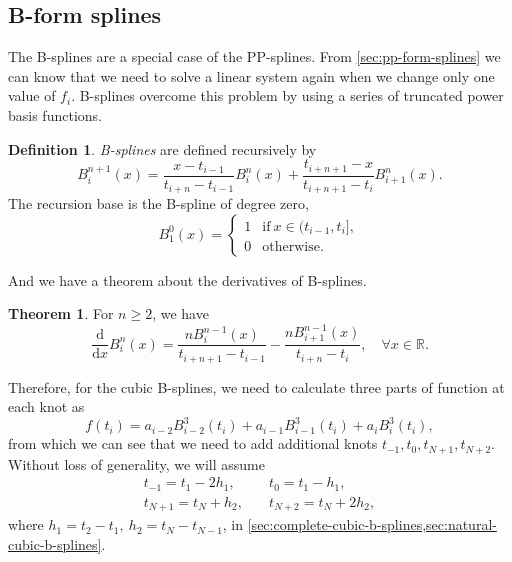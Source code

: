 \documentclass[a4paper]{article}
\theoremstyle{definition}
\newtheorem{definition}{Definition}
\newtheorem{theorem}{Theorem}
\begin{document}
\subsection{B-form splines}

The B-splines are a special case of the PP-splines. From \cref{sec:pp-form-splines} we can know that we need to solve a linear system again when we change only one value of $f_i$. B-splines overcome this problem by using a series of truncated power basis functions.

\begin{definition}
  \textit{B-splines} are defined recursively by 
  \begin{equation}
    B_i^{n + 1}(x) = \frac{x - t_{i- 1}}{t_{i + n} - t_{i - 1}}B_i^n(x) + \frac{t_{i + n + 1} - x}{t_{i + n + 1} - t_i}B_{i + 1}^n(x).
    \label{eq:b-spline-recursive}
  \end{equation}
  The recursion base is the B-spline of degree zero,
  \begin{equation}
    B_1^0(x) = \begin{cases}
      1 & \text{if}\ x \in (t_{i - 1}, t_i], \\
      0 & \text{otherwise}.
    \end{cases}
  \end{equation}
\end{definition}

And we have a theorem about the derivatives of B-splines.
\begin{theorem}
  For $n \geqslant 2$, we have 
  \begin{equation}
    \frac{\mathrm{d}}{\mathrm{d}x}B_i^n(x) = \frac{nB_i^{n - 1}(x)}{t_{i + n + 1} - t_{i - 1}} - \frac{nB_{i + 1}^{n - 1}(x)}{t_{i + n} - t_i}, \quad \forall x \in \mathbb{R}.
    \label{eq:b-spline-derivative}
  \end{equation}
\end{theorem}

Therefore, for the cubic B-splines, we need to calculate three parts of function at each knot as 
\begin{equation}
  f(t_i) = a_{i - 2}B_{i - 2}^3(t_i) + a_{i - 1}B_{i - 1}^3(t_i) + a_iB_i^3(t_i),
  \label{eq:cubic-b-spline-function}
\end{equation}
from which we can see that we need to add additional knots $t_{-1}, t_0, t_{N + 1}, t_{N + 2}$. Without loss of generality, we will assume 
\begin{equation}
  \begin{aligned}
    t_{-1} = t_1 - 2h_1,\quad & t_0 = t_1 - h_1, \\
    t_{N + 1} = t_N + h_2,\quad & t_{N + 2} = t_N + 2h_2,
  \end{aligned}
  \label{eq:cubic-b-spline-knots}
\end{equation}
where $h_1 = t_2 - t_1,\ h_2 = t_N - t_{N - 1}$, in \cref{sec:complete-cubic-b-splines,sec:natural-cubic-b-splines}.
\end{document}
